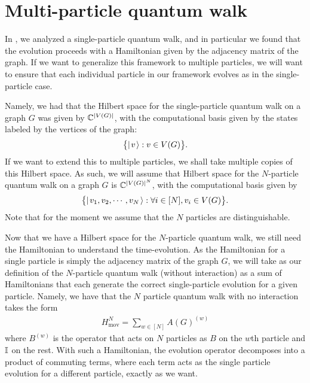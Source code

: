 \documentclass[../thesis-main/thesis-main]{subfiles}
\begin{document}

\section{Multi-particle quantum walk}

In , we analyzed a single-particle quantum walk, and in particular we found that the evolution proceeds with a Hamiltonian given by the adjacency matrix of the graph.  If we want to generalize this framework to multiple particles, we will want to ensure that each individual particle in our framework evolves as in the single-particle case.

Namely, we had that the Hilbert space for the single-particle quantum walk on a graph $G$ was given by $\mathbb{C}^{|V(G)|}$, with the computational basis given by the states labeled by the vertices of the graph:
\begin{align}
  \big\{ |\mspace{2mu} v \mspace{2mu} \rangle: v\in V(G)\big\}.
\end{align}
If we want to extend this to multiple particles, we shall take multiple copies of this Hilbert space.  As such, we will assume that Hilbert space for the $N$-particle quantum walk on a graph $G$ is $\mathbb{C}^{|V(G)|^N}$, with the computational basis given by
\begin{align}
  \big\{ |\mspace{2mu} v_1,v_2,\cdots,v_N \mspace{2mu} \rangle : \forall i \in [N], v_i\in V(G)\big\}.
\end{align}
Note that for the moment we assume that the $N$ particles are distinguishable.

Now that we have a Hilbert space for the $N$-particle quantum walk, we still need the Hamiltonian to understand the time-evolution.  As the Hamiltonian for a single particle is simply the adjacency matrix of the graph $G$, we will take as our definition of the $N$-particle quantum walk (without interaction) as a sum of Hamiltonians that each generate the correct single-particle evolution for a given particle.  Namely, we have that the $N$ particle quantum walk with no interaction takes the form
\begin{align}
  H_{\text{mov}}^N = \sum_{w\in [N]} A(G)^{(w)} \label{eq:MPQW_movement}
\end{align}
where $B^{(w)}$ is the operator that acts on $N$ particles as $B$ on the $w$th particle and $\mathbb{I}$ on the rest.  With such a Hamiltonian, the evolution operator decomposes into a product of commuting terms, where each term acts as the single particle evolution for a different particle, exactly as we want.
\end{document}
